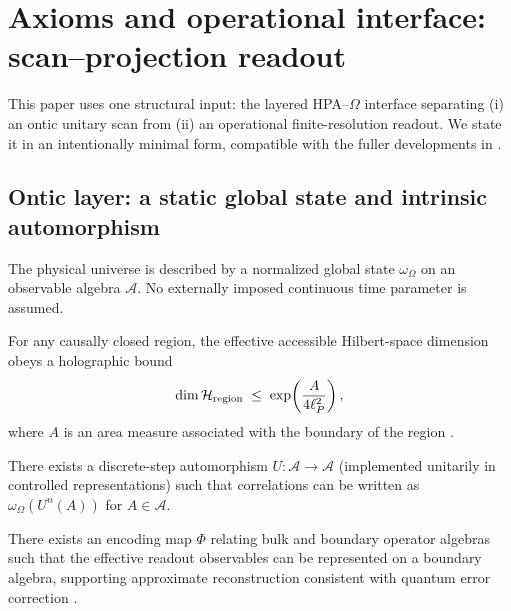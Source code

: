 \section{Axioms and operational interface: scan--projection readout}
\label{sec:axioms_readout}

This paper uses one structural input: the layered HPA--$\Omega$ interface separating (i) an ontic unitary scan from (ii) an operational finite-resolution readout. We state it in an intentionally minimal form, compatible with the fuller developments in \cite{Ma2025HPA,Ma2025FoP,Ma2025HPOT}.

\subsection{Ontic layer: a static global state and intrinsic automorphism}

\begin{axiom}
The physical universe is described by a normalized global state $\omega_\Omega$ on an observable algebra $\mathcal{A}$. No externally imposed continuous time parameter is assumed.
\end{axiom}

\begin{axiom}
For any causally closed region, the effective accessible Hilbert-space dimension obeys a holographic bound
\begin{equation}
\dim \mathcal{H}_{\mathrm{region}} \;\le\; \exp\!\left(\frac{A}{4 \ell_P^2}\right),
\end{equation}
where $A$ is an area measure associated with the boundary of the region \cite{tHooft1993,Susskind1995,Bousso2002}.
\end{axiom}

\begin{axiom}
There exists a discrete-step automorphism $U:\mathcal{A}\to\mathcal{A}$ (implemented unitarily in controlled representations) such that correlations can be written as $\omega_\Omega(U^n(A))$ for $A\in\mathcal{A}$.
\end{axiom}

\begin{axiom}
There exists an encoding map $\Phi$ relating bulk and boundary operator algebras such that the effective readout observables can be represented on a boundary algebra, supporting approximate reconstruction consistent with quantum error correction \cite{AlmheiriDongHarlow2015,Pastawski2015,Harlow2017}.
\end{axiom}

